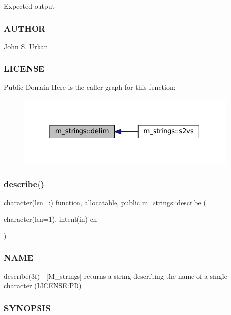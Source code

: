 Expected output \subsubsection*{A\+U\+T\+H\+OR}

John S. Urban \subsubsection*{L\+I\+C\+E\+N\+SE}

Public Domain Here is the caller graph for this function\+:\nopagebreak
\begin{figure}[H]
\begin{center}
\leavevmode
\includegraphics[width=307pt]{namespacem__strings_a9890da826d63d6f04367887007611cb5_icgraph}
\end{center}
\end{figure}
\mbox{\label{namespacem__strings_a8d7007f0c34d7db4c004dac56e609b3f}} 
\subsubsection{\texorpdfstring{describe()}{describe()}}
{\footnotesize\ttfamily character(len=\+:) function, allocatable, public m\+\_\+strings\+::describe (\begin{DoxyParamCaption}\item[{character(len=1), intent(in)}]{ch }\end{DoxyParamCaption})}



\subsubsection*{N\+A\+ME}

describe(3f) -\/ \mbox{[}M\+\_\+strings\mbox{]} returns a string describing the name of a single character (L\+I\+C\+E\+N\+SE\+:PD) 

\subsubsection*{S\+Y\+N\+O\+P\+S\+IS}

